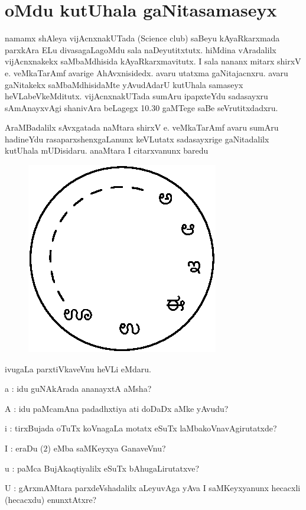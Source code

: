 \chapter{oMdu kutUhala gaNitasamaseyx}

namamx shAleya vijAcnxnakUTada ({\rm Science club})  saBeyu kAyaRkarxmada parxkAra ELu divasagaLagoMdu sala naDeyutitxtutx. hiMdina vAradalilx vijAcnxnakekx saMbaMdhisida kAyaRkarxmavitutx. I sala nananx mitarx shirxV e. veMkaTarAmf avarige AhAvxnisidedx. avaru utatxma gaNitajacnxru. avaru gaNitakekx saMbaMdhisidaMte yAvudAdarU kutUhala samaseyx heVLabeVkeMditutx. vijAcnxnakUTada sumAru ipapxteYdu sadasayxru sAmAnayxvAgi shanivAra beLagegx {\rm 10.30} gaMTege saBe seVrutitxdadxru.

AraMBadalilx sAvxgatada naMtara shirxV e. veMkaTarAmf avaru sumAru hadineYdu rasaparxshenxgaLanunx keVLutatx sadasayxrige gaNitadalilx kutUhala mUDisidaru. anaMtara I citarxvanunx baredu
\begin{figure}[H]
\centering
\includegraphics{src/figures/fig6.eps}
\end{figure}

ivugaLa parxtiVkaveVnu heVLi eMdaru.

a :  idu guNAkArada ananayxtA aMsha?

A :  idu paMcamAna padadhxtiya ati doDaDx aMke yAvudu?

i : tirxBujada oTuTx koVnagaLa motatx eSuTx laMbakoVnavAgirutatxde?

I :  eraDu ($2$) eMba saMKeyxya GanaveVnu?

u :  paMca BujAkaqtiyalilx eSuTx bAhugaLirutatxve?

U :  gArxmAMtara parxdeVshadalilx aLeyuvAga yAva I saMKeyxyanunx hecacxli (hecacxdu) enunxtAtxre?

